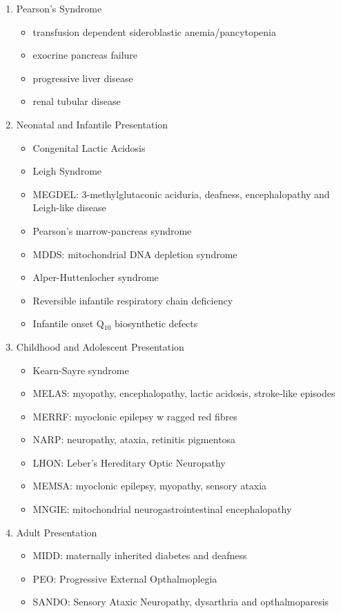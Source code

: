 \documentclass{scrartcl}
\begin{document}
\begin{enumerate}
\item Pearson's Syndrome
\label{sec:orgef5cde9}
\begin{itemize}
\item transfusion dependent sideroblastic anemia/pancytopenia
\item exocrine pancreas failure
\item progressive liver disease
\item renal tubular disease
\end{itemize}

\item Neonatal and Infantile Presentation
\label{sec:orge2733d0}
\begin{itemize}
\item Congenital Lactic Acidosis
\item Leigh Syndrome
\item MEGDEL: 3-methylglutaconic aciduria, deafness, encephalopathy and Leigh-like disease
\item Pearson's marrow-pancreas syndrome
\item MDDS: mitochondrial DNA depletion syndrome
\item Alper-Huttenlocher syndrome
\item Reversible infantile respiratory chain deficiency
\item Infantile onset Q\(_{\text{10}}\) biosynthetic defects
\end{itemize}

\item Childhood and Adolescent Presentation
\label{sec:org0d68fcc}
\begin{itemize}
\item Kearn-Sayre syndrome
\item MELAS: myopathy, encephalopathy, lactic acidosis, stroke-like episodes
\item MERRF: myoclonic epilepsy w ragged red fibres
\item NARP: neuropathy, ataxia, retinitis pigmentosa
\item LHON: Leber's Hereditary Optic Neuropathy
\item MEMSA: myoclonic epilepsy, myopathy, sensory ataxia
\item MNGIE: mitochondrial neurogastrointestinal encephalopathy
\end{itemize}

\item Adult Presentation
\label{sec:orge2703a1}
\begin{itemize}
\item MIDD: maternally inherited diabetes and deafness
\item PEO: Progressive External Opthalmoplegia
\item SANDO: Sensory Ataxic Neuropathy, dysarthria and opthalmoparesis
\end{itemize}
\end{enumerate}
\end{document}
